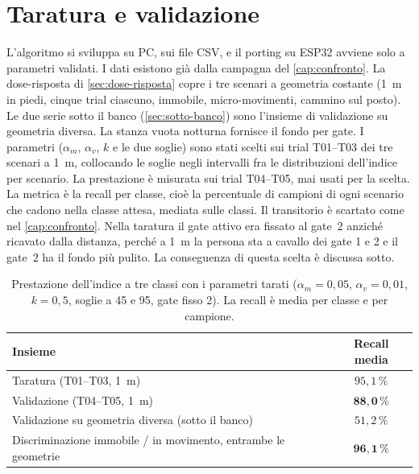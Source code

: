 \section{Taratura e validazione}
\label{sec:vitalita-taratura}

L'algoritmo si sviluppa su PC, sui file CSV, e il porting su ESP32 avviene solo a
parametri validati. I dati esistono già dalla campagna del \cref{cap:confronto}. La
dose-risposta di \cref{sec:dose-risposta} copre i tre scenari a geometria costante
(1~m in piedi, cinque trial ciascuno, immobile, micro-movimenti, cammino sul posto).
Le due serie sotto il banco (\cref{sec:sotto-banco}) sono l'insieme di validazione su
geometria diversa. La stanza vuota notturna fornisce il fondo per gate. I parametri
($\alpha_m$, $\alpha_v$, $k$ e le due soglie) sono stati scelti sui trial T01--T03
dei tre scenari a 1~m, collocando le soglie negli intervalli fra le distribuzioni
dell'indice per scenario. La prestazione è misurata sui trial T04--T05, mai usati per
la scelta. La metrica è la recall per classe, cioè la percentuale di campioni di ogni
scenario che cadono nella classe attesa, mediata sulle classi. Il transitorio è
scartato come nel \cref{cap:confronto}. Nella taratura il gate attivo era fissato al
gate~2 anziché ricavato dalla distanza, perché a 1~m la persona sta a cavallo dei
gate 1 e 2 e il gate~2 ha il fondo più pulito. La conseguenza di questa scelta è
discussa sotto.

\begin{table}[htbp]
\centering
\caption{Prestazione dell'indice a tre classi con i parametri tarati
($\alpha_m = 0{,}05$, $\alpha_v = 0{,}01$, $k = 0{,}5$, soglie a 45 e 95, gate fisso
2). La recall è media per classe e per campione.}
\label{tab:vitalita-validazione}
\small
\begin{tabular}{@{}lc@{}}
\toprule
Insieme & Recall media \\
\midrule
Taratura (T01--T03, 1~m) & $95{,}1\,\%$ \\
Validazione (T04--T05, 1~m) & $\mathbf{88{,}0\,\%}$ \\
Validazione su geometria diversa (sotto il banco) & $51{,}2\,\%$ \\
\midrule
Discriminazione immobile / in movimento, entrambe le geometrie & $\mathbf{96{,}1\,\%}$ \\
\bottomrule
\end{tabular}
\end{table}

